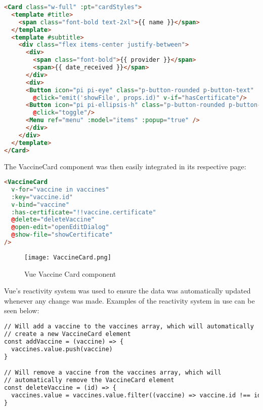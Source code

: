 \begin{lstlisting}[language=HTML, caption=Vue Vaccine Card Component Example]
<Card class="w-full" :pt="cardStyles">
  <template #title>
    <span class="font-bold text-2xl">{{ name }}</span>
  </template>
  <template #subtitle>
    <div class="flex items-center justify-between">
      <div>
        <span class="font-bold">{{ provider }}</span>
        <span>{{ date_received }}</span> 
      </div>
      <div>
      <Button icon="pi pi-eye" class="p-button-rounded p-button-text"
        @click="emit('showFile', props.id)" v-if="hasCertificate"/>
      <Button icon="pi pi-ellipsis-h" class="p-button-rounded p-button-text"
        @click="toggle"/>
      <Menu ref="menu" :model="items" :popup="true" />
      </div>
    </div>
  </template>
</Card>  
\end{lstlisting}

The VaccineCard component was then easily integrated in its respective page:

\begin{lstlisting}[language=HTML, caption=Using VaccineCard Component]
<VaccineCard
  v-for="vaccine in vaccines"
  :key="vaccine.id" 
  v-bind="vaccine"
  :has-certificate="!!vaccine.certificate"
  @delete="deleteVaccine"
  @open-edit="openEditDialog"
  @show-file="showCertificate"
/>
\end{lstlisting}

\begin{figure}[htbp]
  \centering
  \texttt{[image: VaccineCard.png]}
  \caption{Vue Vaccine Card component}\label{fig:vaccinecard}
\end{figure}

\FloatBarrier{}

Vue's reactivity system was used to ensure the data was automatically updated whenever any change was made. Examples of the reactivity system in use can be seen below:


\begin{lstlisting}[language=HTML, caption=Vue Reactivity System]
// Will add a vaccine to the vaccines array, which will automatically 
// create a new VaccineCard element
const addVaccine = (vaccine) => {
  vaccines.value.push(vaccine)
}

// Will remove a vaccine from the vaccines array, which will 
// automatically remove the VaccineCard element
const deleteVaccine = (id) => {
  vaccines.value = vaccines.value.filter((vaccine) => vaccine.id !== id)
}
\end{lstlisting}

